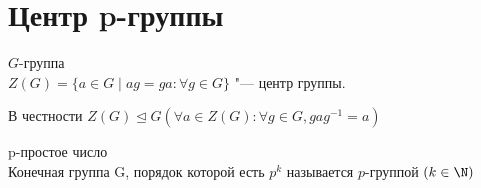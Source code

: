 ﻿\section{Центр p-группы}
\begin{Def}
$G$-группа\\
$Z(G) = \{a \in G \mid ag = ga\colon \forall g \in G \}$ "--- центр группы.

В честности $Z(G) \unlhd G (\forall a \in Z(G) \colon \forall g \in G, gag^{-1} = a)$ \\
\end{Def}
\begin{Def}
p-простое число\\
Конечная группа G, порядок которой 
есть $p^{k}$ называется $p$-группой $(k \in \N)$\\
\end{Def}

